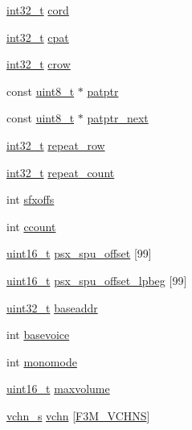 \begin{DoxyCompactItemize}
\item 
\hyperlink{inttypes_8h_a32f2e37ee053cf2ce8ca28d1f74630e5}{int32\+\_\+t} \hyperlink{structplayer__s_a6852e1632857a8f73025e0db6c8694b2}{cord}
\item 
\hyperlink{inttypes_8h_a32f2e37ee053cf2ce8ca28d1f74630e5}{int32\+\_\+t} \hyperlink{structplayer__s_af74eca61b9bd73ff88a71278eb41812a}{cpat}
\item 
\hyperlink{inttypes_8h_a32f2e37ee053cf2ce8ca28d1f74630e5}{int32\+\_\+t} \hyperlink{structplayer__s_a096deec999caf7247e70748c5aa21f99}{crow}
\item 
const \hyperlink{inttypes_8h_aba7bc1797add20fe3efdf37ced1182c5}{uint8\+\_\+t} $\ast$ \hyperlink{structplayer__s_ae0fa290b22546b4b5fc8e97ea99dd026}{patptr}
\item 
const \hyperlink{inttypes_8h_aba7bc1797add20fe3efdf37ced1182c5}{uint8\+\_\+t} $\ast$ \hyperlink{structplayer__s_ad33724d51fd353bc9d75aef77c6d9e7c}{patptr\+\_\+next}
\item 
\hyperlink{inttypes_8h_a32f2e37ee053cf2ce8ca28d1f74630e5}{int32\+\_\+t} \hyperlink{structplayer__s_a6223490a18203088a68d3fb04ddc6d59}{repeat\+\_\+row}
\item 
\hyperlink{inttypes_8h_a32f2e37ee053cf2ce8ca28d1f74630e5}{int32\+\_\+t} \hyperlink{structplayer__s_af7cfa98e3c358aca0869f8f801ca0ffa}{repeat\+\_\+count}
\item 
int \hyperlink{structplayer__s_a653f0f7aa7453b01d0b637f59d1b4e21}{sfxoffs}
\item 
int \hyperlink{structplayer__s_a7a64d7f824863588a1f0bf03cf18087c}{ccount}
\item 
\hyperlink{inttypes_8h_a273cf69d639a59973b6019625df33e30}{uint16\+\_\+t} \hyperlink{structplayer__s_af3c154d2cbd1c92554e481bdf2e99046}{psx\+\_\+spu\+\_\+offset} \mbox{[}99\mbox{]}
\item 
\hyperlink{inttypes_8h_a273cf69d639a59973b6019625df33e30}{uint16\+\_\+t} \hyperlink{structplayer__s_a1f345d4fe2df8329823cbcdf8991c892}{psx\+\_\+spu\+\_\+offset\+\_\+lpbeg} \mbox{[}99\mbox{]}
\item 
\hyperlink{inttypes_8h_a435d1572bf3f880d55459d9805097f62}{uint32\+\_\+t} \hyperlink{structplayer__s_aa1a3e8675fae7ba40f0c9375251d96a0}{baseaddr}
\item 
int \hyperlink{structplayer__s_a722550b333063b8d13ae6535623168b7}{basevoice}
\item 
int \hyperlink{structplayer__s_ad970c6c606d433f8224ef7bced77b05c}{monomode}
\item 
\hyperlink{inttypes_8h_a273cf69d639a59973b6019625df33e30}{uint16\+\_\+t} \hyperlink{structplayer__s_a9e33cf4247c0395448e0b4337664bfde}{maxvolume}
\item 
\hyperlink{structvchn__s}{vchn\+\_\+s} \hyperlink{structplayer__s_a080fb2e562e73d54c01e416fe8d4910a}{vchn} \mbox{[}\hyperlink{f3m_8h_a029404388ed8137e42bc7c94f667dec6}{F3\+M\+\_\+\+V\+C\+H\+NS}\mbox{]}
\end{DoxyCompactItemize}


